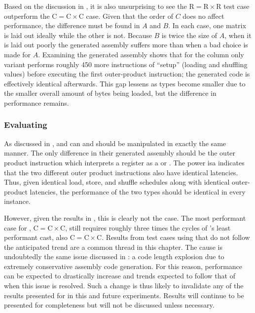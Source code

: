\documentclass[\main/thesis.tex]{subfiles}
\begin{document}
Based on the discussion in , it is also unsurprising to see the $\textrm{R} = \textrm{R} \times \textrm{R}$ test case outperform the $\textrm{C} = \textrm{C} \times \textrm{C}$ case.
Given that the order of $C$ does no affect performance, the difference must be found in $A$ and $B$.
In each case, one matrix is laid out ideally while the other is not.
Because $B$ is twice the size of $A$, when it is laid out poorly the generated assembly suffers more than when a bad choice is made for $A$.
Examining the generated assembly shows that for  the column only variant performs roughly 450 more instructions of ``setup'' (loading and shuffling values) before executing the first outer-product instruction; the generated code is effectively identical afterwards.
This gap lessens as types become smaller due to the smaller overall amount of bytes being loaded, but the difference in performance remains.

\subsubsection{Evaluating \texorpdfstring{}{half}}
As discussed in ,  and  can and should be manipulated in exactly the same manner.
The only difference in their generated assembly should be the outer product instruction which interprets a register as a  or .
The \gls{power} \gls{isa} indicates that the two different outer product instructions also have identical latencies.
Thus, given identical load, store, and shuffle schedules along with identical outer-product latencies, the performance of the two types should be identical in every instance.

However, given the results in , this is clearly not the case.
The most performant case for , $\textrm{C} = \textrm{C} \times \textrm{C}$, still requires roughly three times the cycles of 's least performant cast, also $\textrm{C} = \textrm{C} \times \textrm{C}$.
Results from test cases using  that do not follow the anticipated trend are a common thread in this chapter.
The cause is undoubtedly the same issue discussed in : a code length explosion due to extremely conservative assembly code generation.
For this reason, performance can be expected to drastically increase and trends expected to follow that of  when this issue is resolved.
Such a change is thus likely to invalidate any of the results presented for  in this and future experiments.
Results will continue to be presented for completeness but will not be discussed unless necessary.
\end{document}
